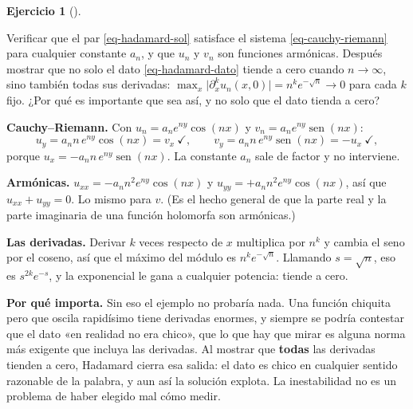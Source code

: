 \documentclass[
  spanish,
  a4paper,
]{scrbook}
\theoremstyle{definition}
\theoremstyle{plain}
\theoremstyle{definition}
\theoremstyle{plain}
\theoremstyle{definition}
\newtheorem{exercise}{Ejercicio}[chapter]
\theoremstyle{remark}
\begin{document}
\begin{exercise}[]\protect\hypertarget{exr-hadamard-verificar}{}\label{exr-hadamard-verificar}

Verificar que el par \ref{eq-hadamard-sol} satisface el sistema
\ref{eq-cauchy-riemann} para cualquier constante \(a_n\), y que \(u_n\)
y \(v_n\) son funciones armónicas. Después mostrar que no solo el dato
\ref{eq-hadamard-dato} tiende a cero cuando \(n \to \infty\), sino
también todas sus derivadas:
\(\max_x \big|\partial_x^k u_n(x,0)\big| = n^k e^{-\sqrt n} \to 0\) para
cada \(k\) fijo. ¿Por qué es importante que sea así, y no solo que el
dato tienda a cero?

\end{exercise}

\begin{tcolorbox}[enhanced jigsaw, arc=.35mm, bottomrule=.15mm, bottomtitle=1mm, breakable, colback=white, colbacktitle=quarto-callout-tip-color!10!white, colframe=quarto-callout-tip-color-frame, coltitle=black, left=2mm, leftrule=.75mm, opacityback=0, opacitybacktitle=0.6, rightrule=.15mm, title=\textcolor{quarto-callout-tip-color}{\faLightbulb}\hspace{0.5em}{Solución}, titlerule=0mm, toprule=.15mm, toptitle=1mm]

\textbf{Cauchy--Riemann.} Con \(u_n = a_n e^{ny}\cos(nx)\) y
\(v_n = a_n e^{ny}\operatorname{sen}(nx)\): \[
u_y = a_n n\,e^{ny}\cos(nx) = v_x \ \checkmark, \qquad
v_y = a_n n\,e^{ny}\operatorname{sen}(nx) = -u_x \ \checkmark,
\] porque \(u_x = -a_n n\,e^{ny}\operatorname{sen}(nx)\). La constante
\(a_n\) sale de factor y no interviene.

\textbf{Armónicas.} \(u_{xx} = -a_n n^2 e^{ny}\cos(nx)\) y
\(u_{yy} = +a_n n^2 e^{ny}\cos(nx)\), así que \(u_{xx}+u_{yy}=0\). Lo
mismo para \(v\). (Es el hecho general de que la parte real y la parte
imaginaria de una función holomorfa son armónicas.)

\textbf{Las derivadas.} Derivar \(k\) veces respecto de \(x\) multiplica
por \(n^k\) y cambia el seno por el coseno, así que el máximo del módulo
es \(n^k e^{-\sqrt n}\). Llamando \(s = \sqrt n\), eso es
\(s^{2k}e^{-s}\), y la exponencial le gana a cualquier potencia: tiende
a cero.

\textbf{Por qué importa.} Sin eso el ejemplo no probaría nada. Una
función chiquita pero que oscila rapidísimo tiene derivadas enormes, y
siempre se podría contestar que el dato «en realidad no era chico», que
lo que hay que mirar es alguna norma más exigente que incluya las
derivadas. Al mostrar que \textbf{todas} las derivadas tienden a cero,
Hadamard cierra esa salida: el dato es chico en cualquier sentido
razonable de la palabra, y aun así la solución explota. La inestabilidad
no es un problema de haber elegido mal cómo medir.

\end{tcolorbox}
\end{document}
